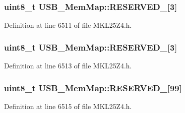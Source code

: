 \subsubsection[{\texorpdfstring{R\+E\+S\+E\+R\+V\+E\+D\+\_\+5}{RESERVED_5}}]{\setlength{\rightskip}{0pt plus 5cm}uint8\+\_\+t U\+S\+B\+\_\+\+Mem\+Map\+::\+R\+E\+S\+E\+R\+V\+E\+D\+\_\mbox{[}3\mbox{]}}\hypertarget{struct_u_s_b___mem_map_a41df5454ebecece7ca24f330d3e76bcf}{}\label{struct_u_s_b___mem_map_a41df5454ebecece7ca24f330d3e76bcf}


Definition at line 6511 of file M\+K\+L25\+Z4.\+h.

\subsubsection[{\texorpdfstring{R\+E\+S\+E\+R\+V\+E\+D\+\_\+6}{RESERVED_6}}]{\setlength{\rightskip}{0pt plus 5cm}uint8\+\_\+t U\+S\+B\+\_\+\+Mem\+Map\+::\+R\+E\+S\+E\+R\+V\+E\+D\+\_\mbox{[}3\mbox{]}}\hypertarget{struct_u_s_b___mem_map_a9e2e1747e92f86edb0c8e9279c76c5ad}{}\label{struct_u_s_b___mem_map_a9e2e1747e92f86edb0c8e9279c76c5ad}


Definition at line 6513 of file M\+K\+L25\+Z4.\+h.

\subsubsection[{\texorpdfstring{R\+E\+S\+E\+R\+V\+E\+D\+\_\+7}{RESERVED_7}}]{\setlength{\rightskip}{0pt plus 5cm}uint8\+\_\+t U\+S\+B\+\_\+\+Mem\+Map\+::\+R\+E\+S\+E\+R\+V\+E\+D\+\_\mbox{[}99\mbox{]}}\hypertarget{struct_u_s_b___mem_map_a369f01d9d4b8ac2f5aced9d041bca57e}{}\label{struct_u_s_b___mem_map_a369f01d9d4b8ac2f5aced9d041bca57e}


Definition at line 6515 of file M\+K\+L25\+Z4.\+h.

